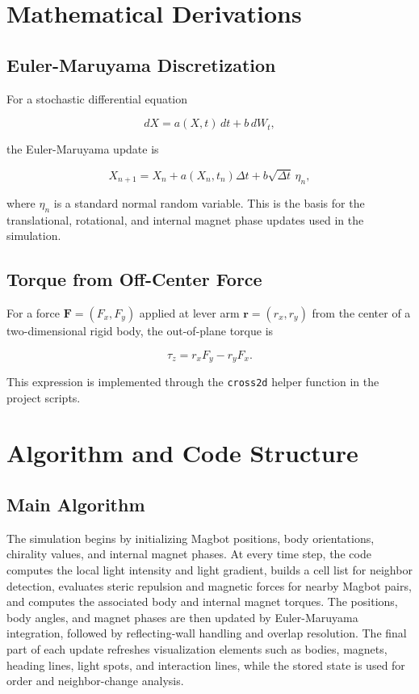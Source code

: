 \documentclass[12pt,a4paper,oneside]{report}
\begin{document}
\chapter{Mathematical Derivations}

\section{Euler-Maruyama Discretization}
For a stochastic differential equation

\begin{equation}
dX = a(X,t)\,dt + b\,dW_t,
\end{equation}

the Euler-Maruyama update is

\begin{equation}
X_{n+1} = X_n + a(X_n,t_n)\Delta t + b\sqrt{\Delta t}\,\eta_n,
\end{equation}

where $\eta_n$ is a standard normal random variable. This is the basis for the translational, rotational, and internal magnet phase updates used in the simulation.

\section{Torque from Off-Center Force}
For a force $\mathbf{F}=(F_x,F_y)$ applied at lever arm $\mathbf{r}=(r_x,r_y)$ from the center of a two-dimensional rigid body, the out-of-plane torque is

\begin{equation}
\tau_z = r_xF_y-r_yF_x.
\end{equation}

This expression is implemented through the \texttt{cross2d} helper function in the project scripts.

\chapter{Algorithm and Code Structure}

\section{Main Algorithm}
The simulation begins by initializing Magbot positions, body orientations, chirality values, and internal magnet phases. At every time step, the code computes the local light intensity and light gradient, builds a cell list for neighbor detection, evaluates steric repulsion and magnetic forces for nearby Magbot pairs, and computes the associated body and internal magnet torques. The positions, body angles, and magnet phases are then updated by Euler-Maruyama integration, followed by reflecting-wall handling and overlap resolution. The final part of each update refreshes visualization elements such as bodies, magnets, heading lines, light spots, and interaction lines, while the stored state is used for order and neighbor-change analysis.
\end{document}
